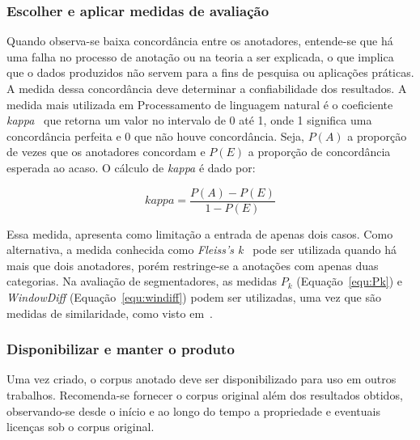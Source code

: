 \subsubsection{Escolher e aplicar medidas de avaliação}

Quando observa-se baixa concordância entre os anotadores, entende-se que há uma falha no processo de anotação ou na teoria a ser explicada, o que implica que o dados produzidos não servem para a fins de pesquisa ou aplicações práticas. A medida dessa concordância deve determinar a confiabilidade dos resultados.
A medida mais utilizada em Processamento de linguagem natural é o coeficiente \textit{kappa}~\cite{Carletta1996} que retorna um valor no intervalo de 0 até 1, onde 1 significa uma concordância perfeita e 0 que não houve concordância. Seja, $P(A)$ a proporção de vezes que os anotadores concordam e $P(E)$ a proporção de concordância esperada ao acaso. O cálculo de \textit{kappa} é dado por:

\begin{equation}
	kappa = \frac{P(A) - P(E)}{1 - P(E)}
\end{equation}

Essa medida, apresenta como limitação a entrada de apenas dois casos. Como alternativa, a medida conhecida como \textit{Fleiss's k}~\cite{Fleiss1979} pode ser utilizada quando há mais que dois anotadores, porém restringe-se a anotações com apenas duas categorias. 
Na avaliação de segmentadores, as medidas $P_k$ (Equação~\ref{equ:Pk}) e \textit{WindowDiff} (Equação~\ref{equ:windiff}) podem ser utilizadas, uma vez que são medidas de similaridade, como visto em~\cite{Kazantseva2012,Cardoso2017}.



\subsubsection{Disponibilizar e manter o produto}

Uma vez criado, o corpus anotado deve ser disponibilizado para uso em outros trabalhos. 
Recomenda-se fornecer o corpus original além dos resultados obtidos, observando-se desde o início e ao longo do tempo a propriedade e eventuais licenças sob o corpus original.




